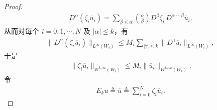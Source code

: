 \documentclass[../../main.tex]{subfiles}
\begin{document}
\begin{proof}
\begin{align*}
D^{\alpha}(\zeta_i\overline{u}_i)=\sum_{\beta\leqslant\alpha}\binom{\alpha}{\beta}D^{\beta}\zeta_i\,D^{\alpha-\beta}\overline{u}_i.
\end{align*}
从而对每个 $i=0,1,\cdots,N$ 及 $|\alpha|\leqslant k$，有
\begin{align*}
\|D^{\alpha}(\zeta_i\overline{u}_i)\|_{L^{\infty}(W_i)}
\leqslant M_i\sum_{|\gamma|\leqslant k}\|D^{\gamma}\overline{u}_i\|_{L^{\infty}(W_i)},
\end{align*}
于是
\begin{align}
\|\zeta_i\overline{u}_i\|_{W^{k,\infty}(W_i)}\leqslant M_i\|\overline{u}_i\|_{W^{k,\infty}(W_i)}.\label{eqnjkNJNS1}
\end{align}
令
\begin{align*}
E_ku\triangleq\overline{u}\triangleq\sum_{i=0}^{N}\zeta_i\overline{u}_i.
\end{align*}


\end{proof}
\end{document}
